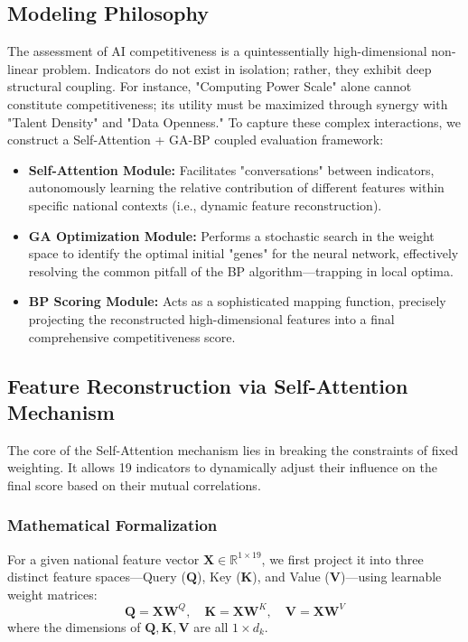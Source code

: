 \documentclass[12pt]{article}
\begin{document}
	\subsection{Modeling Philosophy}
	The assessment of AI competitiveness is a quintessentially high-dimensional non-linear problem. Indicators do not exist in isolation; rather, they exhibit deep structural coupling. For instance, "Computing Power Scale" alone cannot constitute competitiveness; its utility must be maximized through synergy with "Talent Density" and "Data Openness."
	To capture these complex interactions, we construct a Self-Attention + GA-BP coupled evaluation framework:
	\begin{itemize}
		\item \textbf{Self-Attention Module:} Facilitates "conversations" between indicators, autonomously learning the relative contribution of different features within specific national contexts (i.e., dynamic feature reconstruction).
		\item \textbf{GA Optimization Module:} Performs a stochastic search in the weight space to identify the optimal initial "genes" for the neural network, effectively resolving the common pitfall of the BP algorithm—trapping in local optima.
		\item \textbf{BP Scoring Module:} Acts as a sophisticated mapping function, precisely projecting the reconstructed high-dimensional features into a final comprehensive competitiveness score.
	\end{itemize}
	
	\subsection{Feature Reconstruction via Self-Attention Mechanism}
	The core of the Self-Attention mechanism lies in breaking the constraints of fixed weighting. It allows 19 indicators to dynamically adjust their influence on the final score based on their mutual correlations.
	
	\subsubsection{Mathematical Formalization}
	For a given national feature vector $\mathbf{X} \in \mathbb{R}^{1 \times 19}$, we first project it into three distinct feature spaces—Query ($\mathbf{Q}$), Key ($\mathbf{K}$), and Value ($\mathbf{V}$)—using learnable weight matrices:
	$$\mathbf{Q} = \mathbf{X} \mathbf{W}^Q, \quad \mathbf{K} = \mathbf{X} \mathbf{W}^K, \quad \mathbf{V} = \mathbf{X} \mathbf{W}^V$$
	where the dimensions of $\mathbf{Q, K, V}$ are all $1 \times d_k$.
	
\end{document}
